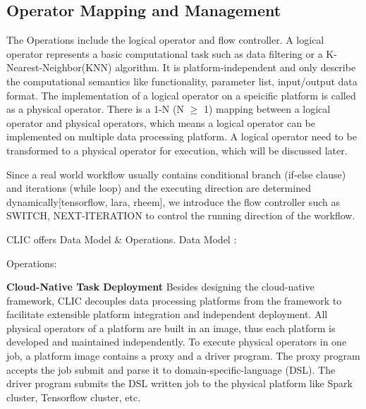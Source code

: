 

\subsection{Operator Mapping and Management}
The Operations include the logical operator and flow controller. 
A logical operator represents a basic computational task such as data filtering or a K-Nearest-Neighbor(KNN) algorithm.
It is platform-independent and only describe the computational semantics like functionality, parameter list, input/output data format.
The implementation of a logical operator on a speicific platform is called as a physical operator.
There is a 1-N (N $\ge$ 1) mapping between a logical operator and physical operators, which means a logical operator can be implemented on multiple data processing platform.
A logical operator need to be transformed to a physical operator for execution, which will be discussed later.

Since a real world workflow usually contains conditional branch (if-else clause) and iterations (while loop)
and the executing direction are determined dynamically[tensorflow, lara, rheem], 
we introduce the flow controller such as SWITCH, NEXT-ITERATION to control the running direction of the workflow. 

CLIC offers Data Model & Operations.
Data Model :

Operations:

\textbf{Cloud-Native Task Deployment} 
Besides designing the cloud-native framework, CLIC decouples data processing platforms from the framework to facilitate extensible platform integration and independent deployment.
All physical operators of a platform are built in an image, thus each platform is developed and maintained independently.
To execute physical operators in one job, a platform image contains a proxy and a driver program.
The proxy program accepts the job submit and parse it to domain-specific-language (DSL). 
The driver program submits the DSL written job to the physical platform like Spark cluster, Tensorflow cluster, etc.



